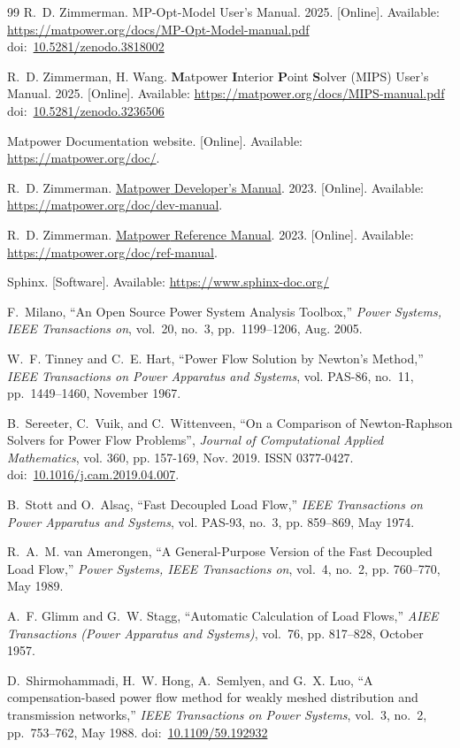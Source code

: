 \documentclass[12pt]{article}
\newcommand{\matpower}[0]{{\sc Matpower}}
\newcommand{\mips}[0]{{MIPS}}
\newcommand{\mipsname}[0]{{{\bf M}{\sc atpower} \textbf{I}nterior \textbf{P}oint \textbf{S}olver}}
\newcommand{\mpom}[0]{\mbox{MP-Opt-Model}}
\newcommand{\mpomname}[0]{\mpom{}}
\newcommand{\mdmurl}[0]{https://matpower.org/doc/dev-manual}
\newcommand{\mdm}[0]{\href{\mdmurl}{\matpower{} Developer's Manual}}
\newcommand{\mrmurl}[0]{https://matpower.org/doc/ref-manual}
\newcommand{\mrm}[0]{\href{\mrmurl}{\matpower{} Reference Manual}}
\newcommand{\currentmipsmanurl}[0]{https://matpower.org/docs/MIPS-manual.pdf}
\newcommand{\currentmpommanurl}[0]{https://matpower.org/docs/MP-Opt-Model-manual.pdf}
\newcommand{\doi}[1]{doi:~\href{https://doi.org/#1}{#1}}
\numberwithin{equation}{section}
\numberwithin{table}{section}
\numberwithin{figure}{section}
\begin{document}
\begin{thebibliography}{99}
R.~D. Zimmerman. \mpomname{} User's Manual. 2025. [Online]. Available: \url{\currentmpommanurl}\\
\doi{10.5281/zenodo.3818002}

R.~D. Zimmerman, H. Wang. \mipsname{} (\mips{}) User's Manual. 2025. [Online]. Available: \url{\currentmipsmanurl}
\doi{10.5281/zenodo.3236506}

\matpower{} Documentation website. [Online]. Available: \url{https://matpower.org/doc/}.

R.~D. Zimmerman. \mdm. 2023. [Online]. Available: \url{\mdmurl}.

R.~D. Zimmerman. \mrm. 2023. [Online]. Available: \url{\mrmurl}.

Sphinx. [Software]. Available: \url{https://www.sphinx-doc.org/}

F.~Milano, ``An Open Source Power System Analysis Toolbox,'' \emph{Power
  Systems, IEEE Transactions on}, vol.~20, no.~3, pp.~1199--1206, Aug. 2005.

W.~F. Tinney and C.~E. Hart, ``Power Flow Solution by Newton's Method,''
  \emph{IEEE Transactions on Power Apparatus and Systems}, vol. PAS-86, no.~11,
  pp.~1449--1460, November 1967.

B.~Sereeter, C.~Vuik, and C.~Wittenveen, ``On a Comparison of Newton-Raphson Solvers for Power Flow Problems'', \emph{Journal of Computational Applied Mathematics}, vol. 360, pp. 157-169, Nov. 2019. ISSN 0377-0427. \doi{10.1016/j.cam.2019.04.007}.

B.~Stott and O.~Alsa{\c c}, ``Fast Decoupled Load Flow,'' \emph{IEEE
  Transactions on Power Apparatus and Systems}, vol. PAS-93, no.~3, pp.
  859--869, May 1974.

R.~A.~M. van Amerongen, ``A General-Purpose Version of the Fast Decoupled Load
  Flow,'' \emph{Power Systems, IEEE Transactions on}, vol.~4, no.~2, pp.
  760--770, May 1989.

A.~F. Glimm and G.~W. Stagg, ``Automatic Calculation of Load Flows,''
  \emph{AIEE Transactions (Power Apparatus and Systems)}, vol.~76, pp.
  817--828, October 1957.

D.~Shirmohammadi, H.~W. Hong, A.~Semlyen, and G.~X. Luo, ``A compensation-based
  power flow method for weakly meshed distribution and transmission networks,''
  \emph{IEEE Transactions on Power Systems}, vol.~3, no.~2, pp.~753--762, May
  1988.
  \doi{10.1109/59.192932}


\end{thebibliography}
\end{document}

